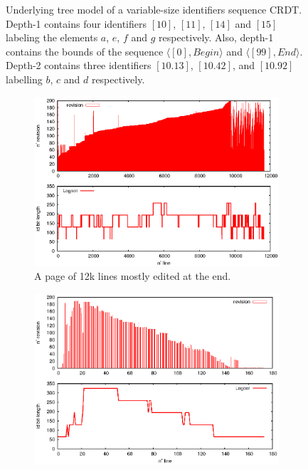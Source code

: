 \begin{figure}[h]
\begin{center}

\caption{Underlying tree model of a variable-size identifiers sequence CRDT.
  Depth-1 contains four identifiers $[10]$, $[11]$, $[14]$ and $[15]$ labeling
  the elements $a$, $e$, $f$ and $g$ respectively. Also, depth-1 contains the
  bounds of the sequence $\langle [0], Begin \rangle$ and $\langle [99],End
  \rangle$. Depth-2 contains three identifiers $[10.13]$, $[10.42]$, and
  $[10.92]$ labelling $b$, $c$ and $d$ respectively.  }
\label{fig:treeexample}
\end{center}
\end{figure}


\begin{figure}
\begin{subfigure}[t]{0.5\textwidth}
  \includegraphics[width=\textwidth]{img/compliant.eps}
  \caption{A page of 12k lines mostly edited at
    the end.}
  \label{im:posteonlyblue}
\end{subfigure}
\hfill
\begin{subfigure}[t]{0.5\textwidth}
\includegraphics[width=\textwidth]{img/motivating.eps}

\end{subfigure}
\end{figure}
